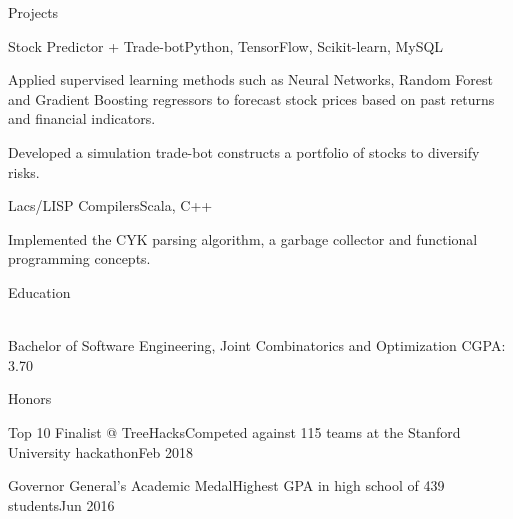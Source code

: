 \documentclass{resume} %
\begin{document}

\begin{rSection}{Projects}

\begin{projSec}{Stock Predictor + Trade-bot}{}{Python, TensorFlow, Scikit-learn, MySQL \href{https://github.com/UWCESEDUO/stock-prediction}{\space\faGithub}}
\item Applied supervised learning methods such as Neural Networks, Random Forest and Gradient Boosting regressors to forecast stock prices based on past returns and financial indicators.
\item Developed a simulation trade-bot constructs a portfolio of stocks to diversify risks.
\end{projSec}

\begin{projSec}{Lacs/LISP Compilers}{}{Scala, C++ \href{https://github.com/jsun98/SchemePlusPlus}{\space\faGithub}}
\item Implemented the CYK parsing algorithm, a garbage collector and functional programming concepts.
\end{projSec}

\end{rSection}



\begin{rSection}{Education}

\vspace{-1em}
\\ Bachelor of Software Engineering, Joint Combinatorics and Optimization \hfill {CGPA: 3.70 }

\end{rSection}


\begin{rSection}{Honors}

\begin{honorSec}{Top 10 Finalist @ TreeHacks}{Competed against 115 teams at the Stanford University hackathon}{Feb 2018}\end{honorSec}
\begin{honorSec}{Governor General's Academic Medal}{Highest GPA in high school of 439 students}{Jun 2016}\end{honorSec}
\vspace{1em} 

\end{rSection}
\end{document}
